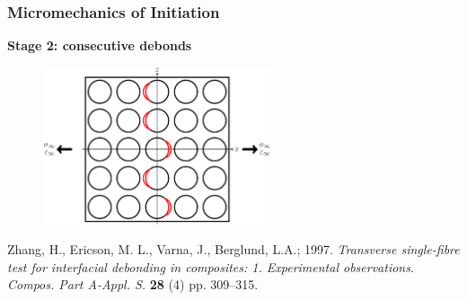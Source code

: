 \documentclass[first,firstsupp,lastsupp,last,hyperref,table]{ETHclass}
\begin{document}
\begin{frame}
\frametitle{\vspace{0.2cm}\small Micromechanics of Initiation}
\vspace{-0.5cm}
\centering
\begin{alertblock}{\centering\scriptsize\bf Stage 2: consecutive debonds}
\vspace{-0.25cm}
\begin{figure}
\centering
\includegraphics[width=0.6\textwidth]{stage2-critdebonds.pdf}
\end{figure}
\end{alertblock}
\vspace{-0.5cm}
{\tiny Zhang, H., Ericson, M. L., Varna, J., Berglund, L.A.; 1997. {\em\tiny Transverse single-fibre test for interfacial debonding in composites: 1. Experimental observations}. {\it\tiny Compos. Part A-Appl. S.} {\bf\tiny 28} (4) pp. 309--315.}
\end{frame}

\addtocounter{framenumber}{-1}
\end{document}
